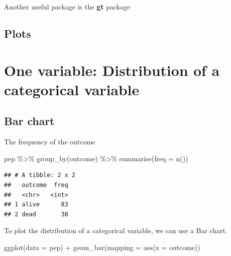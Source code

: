 \documentclass[
  10pt,
]{krantz}
\newenvironment{Shaded}{\begin{snugshade}}{\end{snugshade}}
\newcommand{\AttributeTok}[1]{\textcolor[rgb]{0.77,0.63,0.00}{#1}}
\newcommand{\FunctionTok}[1]{\textcolor[rgb]{0.00,0.00,0.00}{#1}}
\newcommand{\NormalTok}[1]{#1}
\newcommand{\SpecialCharTok}[1]{\textcolor[rgb]{0.00,0.00,0.00}{#1}}
\begin{document}
Another useful package is the \textbf{gt} package

\hypertarget{plots}{%
\subsection{Plots}\label{plots}}

\hypertarget{one-variable-distribution-of-a-categorical-variable}{%
\section{\texorpdfstring{One variable: Distribution of a categorical variable}{One variable: Distribution of a categorical variable}}\label{one-variable-distribution-of-a-categorical-variable}}

\hypertarget{bar-chart}{%
\subsection{\texorpdfstring{Bar chart}{Bar chart}}\label{bar-chart}}

The frequency of the outcome

\begin{Shaded}
\begin{Highlighting}[]
\NormalTok{pep }\SpecialCharTok{\%\textgreater{}\%} \FunctionTok{group\_by}\NormalTok{(outcome) }\SpecialCharTok{\%\textgreater{}\%} \FunctionTok{summarise}\NormalTok{(}\AttributeTok{freq =} \FunctionTok{n}\NormalTok{())}
\end{Highlighting}
\end{Shaded}

\begin{verbatim}
## # A tibble: 2 x 2
##   outcome  freq
##   <chr>   <int>
## 1 alive      83
## 2 dead       38
\end{verbatim}

To plot the distribution of a categorical variable, we can use a Bar chart.

\begin{Shaded}
\begin{Highlighting}[]
\FunctionTok{ggplot}\NormalTok{(}\AttributeTok{data =}\NormalTok{ pep) }\SpecialCharTok{+} 
  \FunctionTok{geom\_bar}\NormalTok{(}\AttributeTok{mapping =} \FunctionTok{aes}\NormalTok{(}\AttributeTok{x =}\NormalTok{ outcome)) }
\end{Highlighting}
\end{Shaded}
\end{document}
